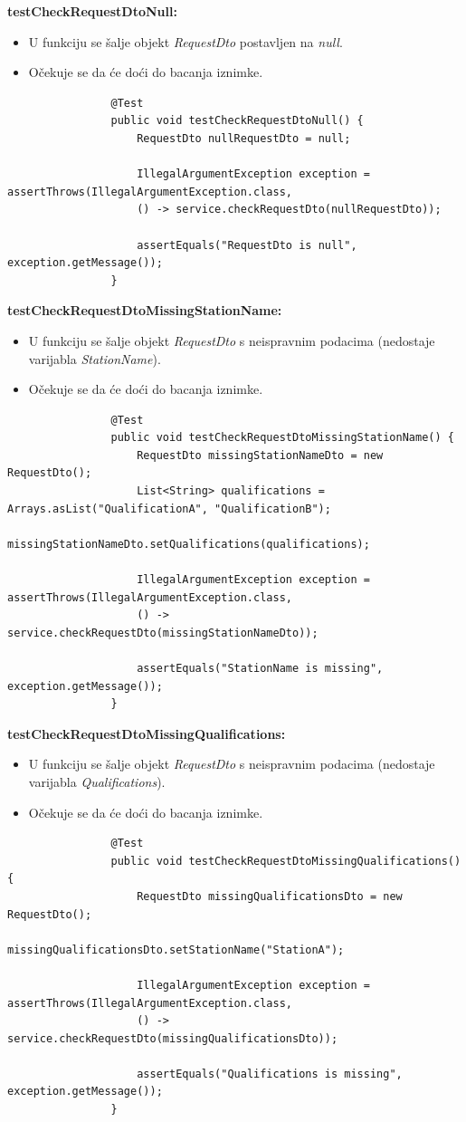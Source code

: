 			\textbf{testCheckRequestDtoNull:}
			\begin{itemize}
				\item U funkciju se šalje objekt \textit{RequestDto} postavljen na \textit{null}.
				\item Očekuje se da će doći do bacanja iznimke.
			\end{itemize}
			\begin{lstlisting}
				@Test
				public void testCheckRequestDtoNull() {
					RequestDto nullRequestDto = null;
					
					IllegalArgumentException exception = assertThrows(IllegalArgumentException.class,
					() -> service.checkRequestDto(nullRequestDto));
					
					assertEquals("RequestDto is null", exception.getMessage());
				}
			\end{lstlisting}
			
			\textbf{testCheckRequestDtoMissingStationName:}
			\begin{itemize}
				\item U funkciju se šalje objekt \textit{RequestDto} s neispravnim podacima (nedostaje varijabla \textit{StationName}).
				\item Očekuje se da će doći do bacanja iznimke.
			\end{itemize}
			\begin{lstlisting}
				@Test
				public void testCheckRequestDtoMissingStationName() {
					RequestDto missingStationNameDto = new RequestDto();
					List<String> qualifications = Arrays.asList("QualificationA", "QualificationB");
					missingStationNameDto.setQualifications(qualifications);
					
					IllegalArgumentException exception = assertThrows(IllegalArgumentException.class,
					() -> service.checkRequestDto(missingStationNameDto));
					
					assertEquals("StationName is missing", exception.getMessage());
				}
			\end{lstlisting}
			
			\textbf{testCheckRequestDtoMissingQualifications:}
			\begin{itemize}
				\item U funkciju se šalje objekt \textit{RequestDto} s neispravnim podacima (nedostaje varijabla \textit{Qualifications}).
				\item Očekuje se da će doći do bacanja iznimke.
			\end{itemize}
			\begin{lstlisting}
				@Test
				public void testCheckRequestDtoMissingQualifications() {
					RequestDto missingQualificationsDto = new RequestDto();
					missingQualificationsDto.setStationName("StationA");
					
					IllegalArgumentException exception = assertThrows(IllegalArgumentException.class,
					() -> service.checkRequestDto(missingQualificationsDto));
					
					assertEquals("Qualifications is missing", exception.getMessage());
				}
			\end{lstlisting}
			
